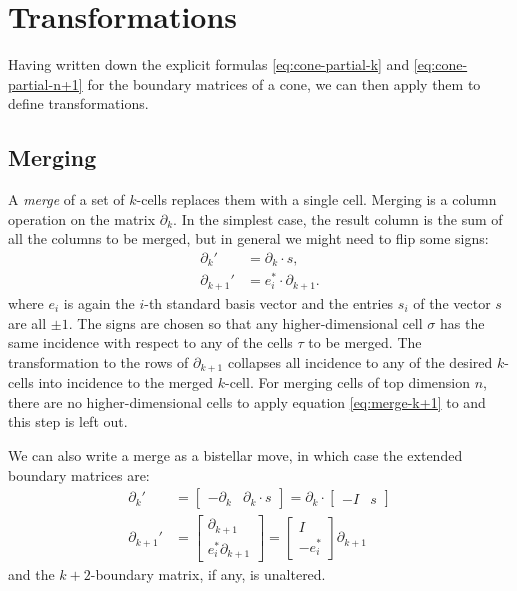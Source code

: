 \documentclass[twocolumn,leqno,twocolumn]{article}
\begin{document}
\section{Transformations}

Having written down the explicit formulas \eqref{eq:cone-partial-k} and \eqref{eq:cone-partial-n+1} for the boundary matrices of a cone, we can then apply them to define transformations.

\subsection{Merging}

A \emph{merge} of a set of $k$-cells replaces them with a single cell.
Merging is a column operation on the matrix $\partial_k$.
In the simplest case, the result column is the sum of all the columns to be merged, but in general we might need to flip some signs:
\begin{align}
    \partial_k' & = \partial_k\cdot s, \\
    \partial_{k + 1}' & = e_i^*\cdot\partial_{k + 1}. \label{eq:merge-k+1}
\end{align}
where $e_i$ is again the $i$-th standard basis vector and the entries $s_i$ of the vector $s$ are all $\pm 1$.
The signs are chosen so that any higher-dimensional cell $\sigma$ has the same incidence with respect to any of the cells $\tau$ to be merged.
The transformation to the rows of $\partial_{k + 1}$ collapses all incidence to any of the desired $k$-cells into incidence to the merged $k$-cell.
For merging cells of top dimension $n$, there are no higher-dimensional cells to apply equation \eqref{eq:merge-k+1} to and this step is left out.

We can also write a merge as a bistellar move, in which case the extended boundary matrices are:
\begin{align}
    \partial_k' & = \left[\begin{matrix}-\partial_k & \partial_k\cdot s\end{matrix}\right]  = \partial_k\cdot\left[\begin{matrix} -I & s\end{matrix}\right]\\
    \partial_{k + 1}' & = \left[\begin{matrix}\partial_{k + 1} \\ e_i^*\partial_{k + 1}\end{matrix}\right] = \left[\begin{matrix} I \\ -e_i^*\end{matrix}\right]\partial_{k + 1}
\end{align}
and the $k + 2$-boundary matrix, if any, is unaltered.
\end{document}
